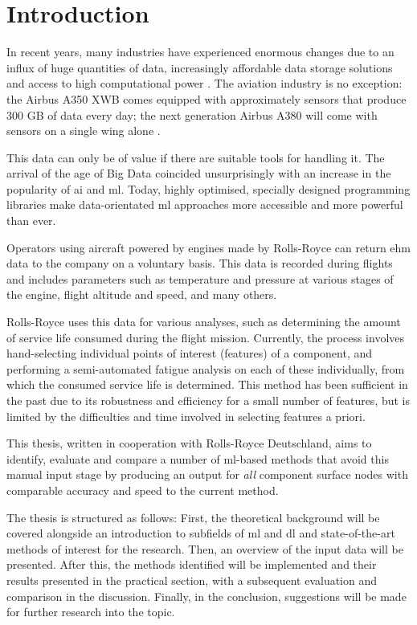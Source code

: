 \chapter{Introduction}
In recent years, many industries have experienced enormous changes due to an influx of huge quantities of data, increasingly affordable data storage solutions and access to high computational power \cite[]{chen_big_2014}. The aviation industry is no exception: the Airbus A350 XWB comes equipped with approximately  sensors that produce 300 GB of data every day; the next generation Airbus A380 will come with  sensors on a single wing alone \cite[]{rajaraman_big_2016}.

This data can only be of value if there are suitable tools for handling it. The arrival of the age of Big Data \cite[]{fan_mining_2013} coincided unsurprisingly with an increase in the popularity of \ac{ai} and \ac{ml}. Today, highly optimised, specially designed programming libraries make data-orientated \ac{ml} approaches more accessible and more powerful than ever.

Operators using aircraft powered by engines made by Rolls-Royce can return \ac{ehm} data to the company on a voluntary basis. This data is recorded during flights and includes parameters such as temperature and pressure at various stages of the engine, flight altitude and speed, and many others.

Rolls-Royce uses this data for various analyses, such as determining the amount of service life consumed during the flight mission. Currently, the process involves hand-selecting individual points of interest (features) of a component, and performing a semi-automated fatigue analysis on each of these individually, from which the consumed service life is determined. This method has been sufficient in the past due to its robustness and efficiency for a small number of features, but is limited by the difficulties and time involved in selecting features a priori.

This thesis, written in cooperation with Rolls-Royce Deutschland, aims to identify, evaluate and compare a number of \ac{ml}-based methods that avoid this manual input stage by producing an output for \textit{all} component surface nodes with comparable accuracy and speed to the current method.

The thesis is structured as follows: First, the theoretical background will be covered alongside an introduction to subfields of \ac{ml} and \ac{dl} and state-of-the-art methods of interest for the research. Then, an overview of the input data will be presented. After this, the methods identified will be implemented and their results presented in the practical section, with a subsequent evaluation and comparison in the discussion. Finally, in the conclusion, suggestions will be made for further research into the topic.